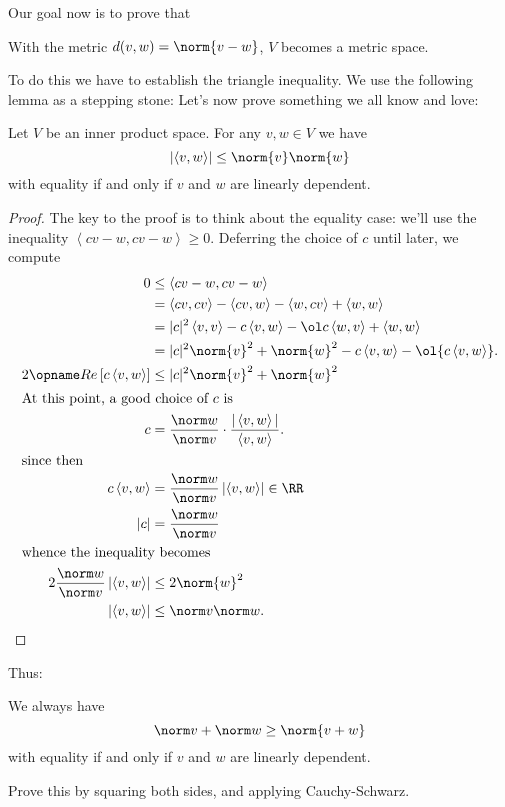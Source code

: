 Our goal now is to prove that
\begin{moral}
	With the metric $d(v,w) = \norm{v-w}$, $V$ becomes a metric space.
\end{moral}
To do this we have to establish the triangle inequality.
We use the following lemma as a stepping stone:
Let's now prove something we all know and love:
\begin{lemma}
	Let $V$ be an inner product space.
	For any $v,w \in V$ we have
	\[ \left\lvert \left< v,w\right> \right\rvert
	\le \norm{v} \norm{w} \]
	with equality if and only if $v$ and $w$ are linearly dependent.
\end{lemma}
\begin{proof}
	The key to the proof is to think about the equality case:
	we'll use the inequality $\left< cv-w, cv-w\right> \ge 0$.
	Deferring the choice of $c$ until later, we compute
	\begin{align*}
		0 &\le \left< cv-w, cv-w \right> \\
		&= \left< cv, cv\right> - \left< cv, w\right> - \left< w, cv\right> + \left< w,w \right> \\
		&= |c|^2 \left< v,v \right> - c \left< v,w \right> - \ol c \left< w,v \right> + \left< w,w \right> \\
		&= |c|^2 \norm{v}^2 + \norm{w}^2 - c \left< v,w \right> - \ol{c \left< v,w\right> }. \\
		2 \Re \left[ c \left< v,w \right> \right] &\le |c|^2 \norm{v}^2 + \norm{w}^2  \\
		\intertext{At this point, a good choice of $c$ is} 
		c &= \frac{ \norm w}{\norm v} \cdot \frac{|\left< v,w\right>|}{\left< v,w\right>}. \\
		\intertext{since then}
		c \left< v,w \right> &= \frac{\norm w}{\norm v} \left\lvert \left< v,w\right> \right\rvert \in \RR \\
		|c| &= \frac{\norm w}{\norm v} \\
		\intertext{whence the inequality becomes}
		 2\frac{\norm w}{\norm v} \left\lvert \left< v,w\right> \right\rvert &\le 2 \norm{w}^2  \\
		 \left\lvert \left< v,w\right> \right\rvert &\le \norm v \norm w. \qedhere
	\end{align*}
\end{proof}
Thus:
\begin{theorem}
	We always have
	\[ \norm v + \norm w \ge \norm{v+w} \]
	with equality if and only if $v$ and $w$ are linearly dependent.
\end{theorem}
\begin{exercise}
	Prove this by squaring both sides, and applying Cauchy-Schwarz.
\end{exercise}

